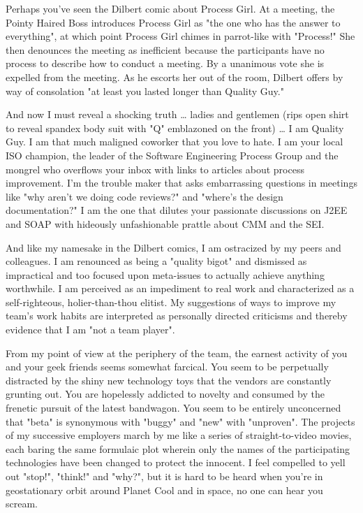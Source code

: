 \documentclass{article}
\begin{document}
Perhaps you've seen the Dilbert comic about Process Girl. At a meeting,
the Pointy Haired Boss introduces Process Girl as "the one who has the
answer to everything", at which point Process Girl chimes in parrot-like
with "Process!" She then denounces the meeting as inefficient because
the participants have no process to describe how to conduct a meeting.
By a unanimous vote she is expelled from the meeting. As he escorts her
out of the room, Dilbert offers by way of consolation "at least you
lasted longer than Quality Guy."

And now I must reveal a shocking truth \ldots{} ladies and gentlemen (rips
open shirt to reveal spandex body suit with "Q" emblazoned on the front)
\ldots{} I am Quality Guy. I am that much maligned coworker that you love to
hate. I am your local ISO champion, the leader of the Software
Engineering Process Group and the mongrel who overflows your inbox with
links to articles about process improvement. I'm the trouble maker that
asks embarrassing questions in meetings like "why aren't we doing code
reviews?" and "where's the design documentation?" I am the one that
dilutes your passionate discussions on J2EE and SOAP with hideously
unfashionable prattle about CMM and the SEI.

And like my namesake in the Dilbert comics, I am ostracized by my peers
and colleagues. I am renounced as being a "quality bigot" and dismissed
as impractical and too focused upon meta-issues to actually achieve
anything worthwhile. I am perceived as an impediment to real work and
characterized as a self-righteous, holier-than-thou elitist. My
suggestions of ways to improve my team's work habits are interpreted as
personally directed criticisms and thereby evidence that I am "not a
team player".

From my point of view at the periphery of the team, the earnest activity
of you and your geek friends seems somewhat farcical. You seem to be
perpetually distracted by the shiny new technology toys that the vendors
are constantly grunting out. You are hopelessly addicted to novelty and
consumed by the frenetic pursuit of the latest bandwagon. You seem to be
entirely unconcerned that "beta" is synonymous with "buggy" and "new"
with "unproven". The projects of my successive employers march by me
like a series of straight-to-video movies, each baring the same
formulaic plot wherein only the names of the participating technologies
have been changed to protect the innocent. I feel compelled to yell out
"stop!", "think!" and "why?", but it is hard to be heard when you're in
geostationary orbit around Planet Cool and in space, no one can hear you
scream.
\end{document}
